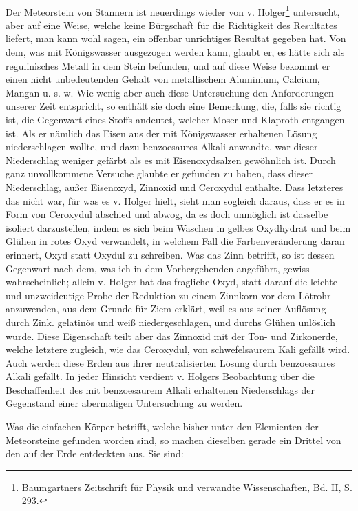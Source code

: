 \documentclass[a4paper, 11pt, oneside]{article}
\begin{document}
\paragraph{}
Der Meteorstein von Stannern ist neuerdings wieder von v. Holger\footnote{Baumgartners Zeitschrift für Physik und verwandte Wissenschaften, Bd. II, S. 293.} untersucht, aber auf eine Weise, welche keine Bürgschaft für die Richtigkeit des Resultates liefert, man kann wohl sagen, ein offenbar unrichtiges Resultat gegeben hat. Von dem, was mit Königswasser ausgezogen werden kann, glaubt er, es hätte sich als regulinisches Metall in dem Stein befunden, und auf diese Weise bekommt er einen nicht unbedeutenden Gehalt von metallischem Aluminium, Calcium, Mangan u. s. w. Wie wenig aber auch diese Untersuchung den Anforderungen unserer Zeit entspricht, so enthält sie doch eine Bemerkung, die, falls sie richtig ist, die Gegenwart eines Stoffs andeutet, welcher Moser und Klaproth entgangen ist. Als er nämlich das Eisen aus der mit Königswasser erhaltenen Lösung niederschlagen wollte, und dazu benzoesaures Alkali anwandte, war dieser Niederschlag weniger gefärbt als es mit Eisenoxydsalzen gewöhnlich ist. Durch ganz unvollkommene Versuche glaubte er gefunden zu haben, dass dieser Niederschlag, außer Eisenoxyd, Zinnoxid und Ceroxydul enthalte. Dass letzteres das nicht war, für was es v. Holger hielt, sieht man sogleich daraus, dass er es in Form von Ceroxydul abschied und abwog, da es doch unmöglich ist dasselbe isoliert darzustellen, indem es sich beim Waschen in gelbes Oxydhydrat und beim Glühen in rotes Oxyd verwandelt, in welchem Fall die Farbenveränderung daran erinnert, Oxyd statt Oxydul zu schreiben. Was das Zinn betrifft, so ist dessen Gegenwart nach dem, was ich in dem Vorhergehenden angeführt, gewiss wahrscheinlich; allein v. Holger hat das fragliche Oxyd, statt darauf die leichte und unzweideutige Probe der Reduktion zu einem Zinnkorn vor dem Lötrohr anzuwenden, aus dem Grunde für Ziem erklärt, weil es aus seiner Auflösung durch Zink. gelatinös und weiß niedergeschlagen, und durchs Glühen unlöslich wurde. Diese Eigenschaft teilt aber das Zinnoxid mit der Ton- und Zirkonerde, welche letztere zugleich, wie das Ceroxydul, von schwefelsaurem Kali gefällt wird. Auch werden diese Erden aus ihrer neutralisierten Lösung durch benzoesaures Alkali gefällt. In jeder Hinsicht verdient v. Holgers Beobachtung über die Beschaffenheit des mit benzoesaurem Alkali erhaltenen Niederschlags der Gegenstand einer abermaligen Untersuchung zu werden.

Was die einfachen Körper betrifft, welche bisher unter den Elemienten der Meteorsteine gefunden worden sind, so machen dieselben gerade ein Drittel von den auf der Erde entdeckten aus. Sie sind:
\end{document}
